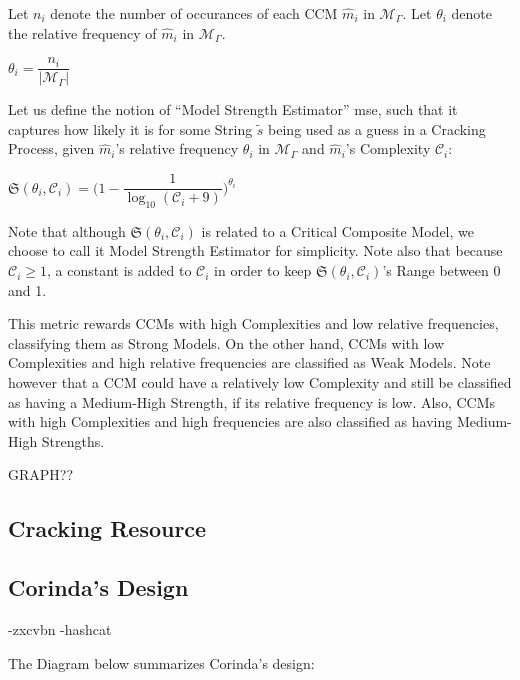 \documentclass{article}
\begin{document}
Let $n_i$ denote the number of occurances of each CCM $\hat m_i$
in $\mathcal{M}_{\Gamma}$. Let $\theta_i$ denote the relative frequency of $\hat m_i$ in $\mathcal{M}_{\Gamma}$.

\begin{center}
 $\theta_i = \dfrac{n_i}{|\mathcal{M}_{\Gamma}|}$
\end{center}

Let us define the notion of ``Model Strength Estimator'' \gls{mse}, such that it captures how likely it is for some String
$\tilde s$ being used as a guess in a Cracking Process, given $\hat m_i$'s relative frequency $\theta_i$ in $\mathcal{M}_{\Gamma}$ and $\hat m_i$'s Complexity $\mathcal{C}_i$:

\begin{center}
 $\mathfrak{S}(\theta_i, \mathcal{C}_i) = \bigg(1 - \dfrac{1}{\log_{10}(\mathcal{C}_i + 9)}\bigg)^{\theta_i}$
\end{center}

Note that although $\mathfrak{S}(\theta_i, \mathcal{C}_i)$ is related to a Critical Composite Model, we choose to call it Model Strength Estimator for simplicity.
Note also that because $\mathcal{C}_i \geqslant 1$, a constant is added to $\mathcal{C}_i$ in order to keep  $\mathfrak{S}(\theta_i, \mathcal{C}_i)$'s Range between 0 and 1. 

This metric rewards CCMs with high Complexities and low relative frequencies, classifying them as Strong Models.
On the other hand, CCMs with low Complexities and high relative frequencies are classified as Weak Models. Note however that a CCM
could have a relatively low Complexity and still be classified as having a Medium-High Strength, if its relative frequency is low. Also,
CCMs with high Complexities and high frequencies are also classified as having Medium-High Strengths.

GRAPH??

\subsection{Cracking Resource}

\subsection{Corinda's Design}

-zxcvbn
-hashcat

The Diagram below summarizes Corinda's design:


\end{document}
